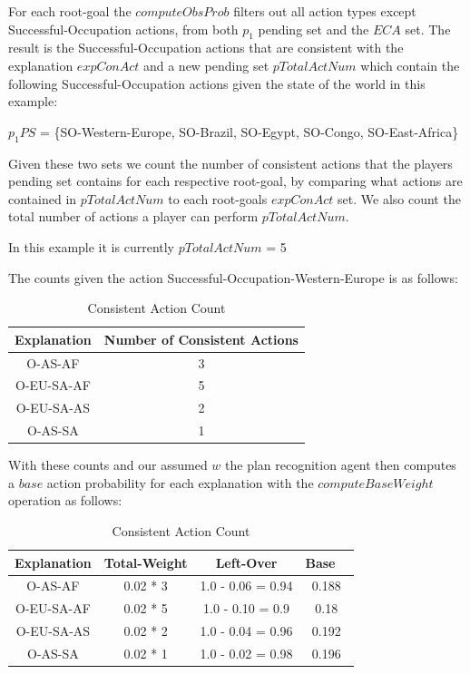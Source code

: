 \documentclass[parskip]{cs4rep}
\begin{document}
For each root-goal the $computeObsProb$ filters out all action types except Successful-Occupation actions, from both $p_1$ pending set and the $ECA$ set. The result is the Successful-Occupation actions that are consistent with the explanation $expConAct$ and a new pending set $pTotalActNum$ which contain the following Successful-Occupation actions given the state of the world in this example:\newline

\centerline{
$p_1PS$ = \{SO-Western-Europe, SO-Brazil, SO-Egypt, SO-Congo, SO-East-Africa\}
}

Given these two sets we count the number of consistent actions that the players pending set contains for each respective root-goal, by comparing what actions are contained in $pTotalActNum$ to each root-goals $expConAct$ set. We also count the total number of actions a player can perform $pTotalActNum$.

In this example it is currently $pTotalActNum$ = 5

The counts given the action Successful-Occupation-Western-Europe is as follows:

\begin{table}[ht]
\centering
\begin{tabular}{|c|c|}
\hline 
\textbf{Explanation} & \textbf{Number of Consistent Actions} \\ 
\hline 
O-AS-AF & 3 \\ 
\hline 
O-EU-SA-AF & 5 \\ 
\hline 
O-EU-SA-AS & 2 \\ 
\hline 
O-AS-SA & 1 \\ 
\hline 
\end{tabular}
\caption{Consistent Action Count}
\label{table:consistent-action-count}
\end{table}

With these counts and our assumed $w$ the plan recognition agent then computes a $base$ action probability for each explanation with the $computeBaseWeight$ operation as follows:

\begin{table}[ht]
\centering
\begin{tabular}{|c|c|c|c|}
\hline 
\textbf{Explanation} & Total-Weight & Left-Over & Base \ \\ 
\hline 
O-AS-AF & 0.02 * 3 & 1.0 - 0.06 = 0.94 & 0.188 \\ 
\hline 
O-EU-SA-AF & 0.02 * 5 & 1.0 - 0.10 = 0.9 & 0.18 \\ 
\hline 
O-EU-SA-AS & 0.02 * 2 & 1.0 - 0.04 = 0.96 & 0.192 \\ 
\hline 
O-AS-SA & 0.02 * 1 & 1.0 - 0.02 = 0.98 & 0.196 \\ 
\hline 
\end{tabular}
\caption{Consistent Action Count}
\label{table:territory-actions-bonus}
\end{table}
\end{document}
